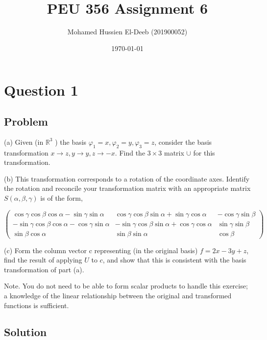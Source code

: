 \documentclass[12pt]{article}
\title{PEU 356 Assignment 6}
\author{Mohamed Hussien El-Deeb (201900052)}
\date{\today}
\begin{document}
\maketitle
\tableofcontents
\hypersetup{linkcolor=RoyalBlue4}

\newpage
\section{Question 1}

\subsection{Problem}

(a) Given (in \(\mathbb{R}^3\) ) the basis \(\varphi_1=x, \varphi_2=y, \varphi_3=z\), consider the basis transformation \(x \rightarrow z, y \rightarrow y, z \rightarrow-x\). Find the \(3 \times 3\) matrix \(\cup \) for this transformation.

(b) This transformation corresponds to a rotation of the coordinate axes. Identify the rotation and reconcile your transformation matrix with an appropriate matrix \(S(\alpha, \beta, \gamma)\) is of the form,

\[
    \begin{pmatrix}
        \cos \gamma \cos \beta \cos \alpha-\sin \gamma \sin \alpha  & \cos \gamma \cos \beta \sin \alpha+\sin \gamma \cos \alpha  & -\cos \gamma \sin \beta \\
        -\sin \gamma \cos \beta \cos \alpha-\cos \gamma \sin \alpha & -\sin \gamma \cos \beta \sin \alpha+\cos \gamma \cos \alpha & \sin \gamma \sin \beta  \\
        \sin \beta \cos \alpha                                      & \sin \beta \sin \alpha                                      & \cos \beta
    \end{pmatrix}
\]

(c) Form the column vector c representing (in the original basis) \(f=2 x-3 y+z\), find the result of applying \(U\) to \(c\), and show that this is consistent with the basis transformation of part (a).

Note. You do not need to be able to form scalar products to handle this exercise; a knowledge of the linear relationship between the original and transformed functions is sufficient.

\subsection{Solution}
\end{document}
